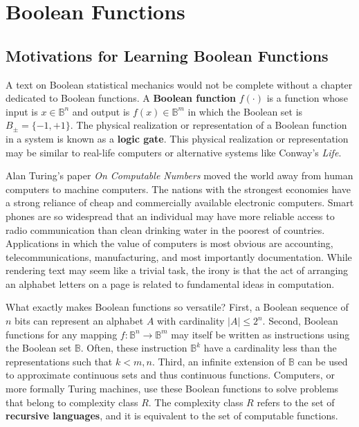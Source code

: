 \documentclass[10pt, a5paper, twoside, openright]{memoir}
\begin{document}
\chapter{Boolean Functions}
\section{Motivations for Learning Boolean Functions}

A text on Boolean statistical mechanics would not be complete without a chapter dedicated to Boolean functions. A \textbf{Boolean function} $f(\cdot)$ is a function whose input is $x \in \mathbb B^n$ and output is $f(x) \in \mathbb B^m$ in which the Boolean set is $B_\pm = \{-1, +1\}$. The physical realization or representation of a Boolean function in a system is known as a \textbf{logic gate}. This physical realization or representation may be similar to real-life computers or alternative systems like Conway's \textit{Life}.

Alan Turing's paper \textit{On Computable Numbers} moved the world away from human computers to machine computers. The nations with the strongest economies have a strong reliance of cheap and commercially available electronic computers. Smart phones are so widespread that an individual may have more reliable access to radio communication than clean drinking water in the poorest of countries. Applications in which the value of computers is most obvious are accounting, telecommunications, manufacturing, and most importantly documentation. While rendering text may seem like a trivial task, the irony is that the act of arranging an alphabet letters on a page is related to fundamental ideas in computation.

What exactly makes Boolean functions so versatile? First, a Boolean sequence of $n$ bits can represent an alphabet $A$ with cardinality $|A| \leq 2^n$. Second, Boolean functions for any mapping $f: \mathbb B^n \rightarrow \mathbb B^m$ may itself be written as instructions using the Boolean set $\mathbb B$. Often, these instruction $\mathbb B^k$ have a cardinality less than the representations such that $k < m,n$. Third, an infinite extension of $\mathbb B$ can be used to approximate continuous sets and thus continuous functions. Computers, or more formally Turing machines, use these Boolean functions to solve problems that belong to complexity class $R$. The complexity class $R$ refers to the set of \textbf{recursive languages}, and it is equivalent to the set of computable functions.
\end{document}
